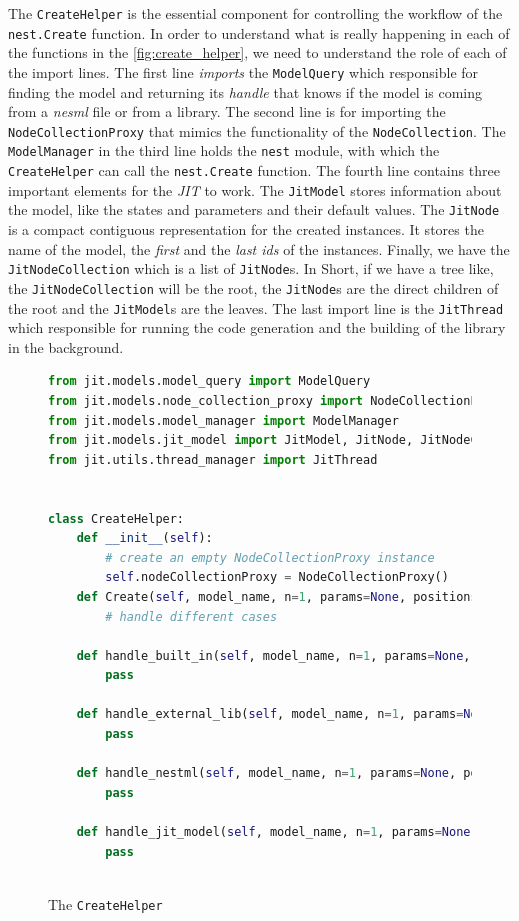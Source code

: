 The \texttt{CreateHelper} is the essential component for controlling the workflow of the \texttt{nest.Create} function. In order to understand what is really happening in each of the functions in the \autoref{fig:create_helper}, we need to understand the role of each of the import lines. The first line \emph{imports} the \texttt{ModelQuery} which responsible for finding the model and returning its \emph{handle} that knows if the model is coming from a \emph{nesml} file or from a library. The second line is for importing the \texttt{NodeCollectionProxy} that mimics the functionality of the \texttt{NodeCollection}. The \texttt{ModelManager} in the third line holds the \texttt{nest} module, with which the \texttt{CreateHelper} can call the \texttt{nest.Create} function. The fourth line contains three important elements for the \emph{JIT} to work. The \texttt{JitModel} stores information about the model, like the states and parameters and their default values. The \texttt{JitNode} is a compact contiguous representation for the created instances. It stores the name of the model, the \emph{first} and the \emph{last ids} of the instances. Finally, we have the \texttt{JitNodeCollection} which is a list of \texttt{JitNode}s. In Short, if we have a tree like, the \texttt{JitNodeCollection} will be the root, the \texttt{JitNode}s are the direct children of the root and the \texttt{JitModel}s are the leaves. The last import line is the \texttt{JitThread} which responsible for running the code generation and the building of the library in the background.
\begin{figure}[ht!]
    \centering
    \begin{lstlisting}[language=Python]
from jit.models.model_query import ModelQuery
from jit.models.node_collection_proxy import NodeCollectionProxy
from jit.models.model_manager import ModelManager
from jit.models.jit_model import JitModel, JitNode, JitNodeCollection
from jit.utils.thread_manager import JitThread


class CreateHelper:
    def __init__(self):
        # create an empty NodeCollectionProxy instance
        self.nodeCollectionProxy = NodeCollectionProxy()
    def Create(self, model_name, n=1, params=None, positions=None):
        # handle different cases
        
    def handle_built_in(self, model_name, n=1, params=None, positions=None):
        pass
        
    def handle_external_lib(self, model_name, n=1, params=None, positions=None):
        pass
    
    def handle_nestml(self, model_name, n=1, params=None, positions=None): 
        pass
        
    def handle_jit_model(self, model_name, n=1, params=None, positions=None):
        pass
    
\end{lstlisting}
    \caption{The \texttt{CreateHelper}}
    \label{fig:create_helper}
\end{figure}


